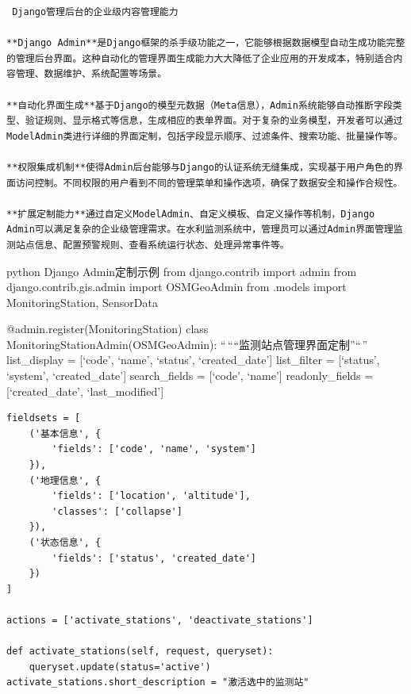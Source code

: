 \begin{lstlisting}
 Django管理后台的企业级内容管理能力

**Django Admin**是Django框架的杀手级功能之一，它能够根据数据模型自动生成功能完整的管理后台界面。这种自动化的管理界面生成能力大大降低了企业应用的开发成本，特别适合内容管理、数据维护、系统配置等场景。

**自动化界面生成**基于Django的模型元数据（Meta信息），Admin系统能够自动推断字段类型、验证规则、显示格式等信息，生成相应的表单界面。对于复杂的业务模型，开发者可以通过ModelAdmin类进行详细的界面定制，包括字段显示顺序、过滤条件、搜索功能、批量操作等。

**权限集成机制**使得Admin后台能够与Django的认证系统无缝集成，实现基于用户角色的界面访问控制。不同权限的用户看到不同的管理菜单和操作选项，确保了数据安全和操作合规性。

**扩展定制能力**通过自定义ModelAdmin、自定义模板、自定义操作等机制，Django Admin可以满足复杂的企业级管理需求。在水利监测系统中，管理员可以通过Admin界面管理监测站点信息、配置预警规则、查看系统运行状态、处理异常事件等。
\end{lstlisting}

python  Django Admin定制示例 from django.contrib import admin from django.contrib.gis.admin import OSMGeoAdmin from .models import MonitoringStation, SensorData

@admin.register(MonitoringStation) class MonitoringStationAdmin(OSMGeoAdmin): ``\,````监测站点管理界面定制''``\,'' list\_display = {[}`code', `name', `status', `created\_date'{]} list\_filter = {[}`status', `system', `created\_date'{]} search\_fields = {[}`code', `name'{]} readonly\_fields = {[}`created\_date', `last\_modified'{]}

\begin{verbatim}
fieldsets = [
    ('基本信息', {
        'fields': ['code', 'name', 'system']
    }),
    ('地理信息', {
        'fields': ['location', 'altitude'],
        'classes': ['collapse']
    }),
    ('状态信息', {
        'fields': ['status', 'created_date']
    })
]

actions = ['activate_stations', 'deactivate_stations']

def activate_stations(self, request, queryset):
    queryset.update(status='active')
activate_stations.short_description = "激活选中的监测站"
\end{verbatim}

